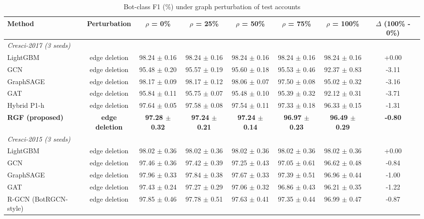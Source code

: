 \begin{table}[!t]
\centering
\caption{Bot-class F1 (\%) under graph perturbation of test accounts}
\label{tab:graph_perturbation}
\scriptsize
\setlength{\tabcolsep}{3pt}
\begin{tabular}{lccccccc}
\hline
\textbf{Method} & \textbf{Perturbation} & \textbf{$\rho$ = 0\%} & \textbf{$\rho$ = 25\%} & \textbf{$\rho$ = 50\%} & \textbf{$\rho$ = 75\%} & \textbf{$\rho$ = 100\%} & \textbf{$\Delta$ (100\% - 0\%)} \\
\hline
\multicolumn{8}{l}{\textit{Cresci-2017 (3 seeds)}} \\
LightGBM & edge deletion & 98.24 $\pm$ 0.16 & 98.24 $\pm$ 0.16 & 98.24 $\pm$ 0.16 & 98.24 $\pm$ 0.16 & 98.24 $\pm$ 0.16 & +0.00 \\
GCN & edge deletion & 95.48 $\pm$ 0.20 & 95.57 $\pm$ 0.19 & 95.60 $\pm$ 0.18 & 95.53 $\pm$ 0.46 & 92.37 $\pm$ 0.83 & -3.11 \\
GraphSAGE & edge deletion & 98.17 $\pm$ 0.09 & 98.17 $\pm$ 0.12 & 98.06 $\pm$ 0.07 & 97.50 $\pm$ 0.08 & 95.02 $\pm$ 0.32 & -3.16 \\
GAT & edge deletion & 95.84 $\pm$ 0.11 & 95.75 $\pm$ 0.07 & 95.48 $\pm$ 0.10 & 95.39 $\pm$ 0.32 & 92.12 $\pm$ 0.31 & -3.71 \\
Hybrid P1-h & edge deletion & 97.64 $\pm$ 0.05 & 97.58 $\pm$ 0.08 & 97.54 $\pm$ 0.11 & 97.33 $\pm$ 0.18 & 96.33 $\pm$ 0.15 & -1.31 \\
\textbf{RGF (proposed)} & \textbf{edge deletion} & \textbf{97.28 $\pm$ 0.32} & \textbf{97.24 $\pm$ 0.21} & \textbf{97.24 $\pm$ 0.14} & \textbf{96.97 $\pm$ 0.23} & \textbf{96.49 $\pm$ 0.29} & \textbf{-0.80} \\
\multicolumn{8}{l}{\textit{Cresci-2015 (3 seeds)}} \\
LightGBM & edge deletion & 98.02 $\pm$ 0.36 & 98.02 $\pm$ 0.36 & 98.02 $\pm$ 0.36 & 98.02 $\pm$ 0.36 & 98.02 $\pm$ 0.36 & +0.00 \\
GCN & edge deletion & 97.46 $\pm$ 0.36 & 97.42 $\pm$ 0.39 & 97.25 $\pm$ 0.43 & 97.05 $\pm$ 0.61 & 96.62 $\pm$ 0.48 & -0.84 \\
GraphSAGE & edge deletion & 97.96 $\pm$ 0.33 & 97.84 $\pm$ 0.38 & 97.67 $\pm$ 0.33 & 97.39 $\pm$ 0.51 & 96.96 $\pm$ 0.44 & -1.00 \\
GAT & edge deletion & 97.43 $\pm$ 0.24 & 97.27 $\pm$ 0.29 & 97.06 $\pm$ 0.32 & 96.86 $\pm$ 0.43 & 96.21 $\pm$ 0.35 & -1.22 \\
R-GCN (BotRGCN-style) & edge deletion & 97.85 $\pm$ 0.46 & 97.78 $\pm$ 0.51 & 97.63 $\pm$ 0.41 & 97.35 $\pm$ 0.44 & 96.99 $\pm$ 0.47 & -0.87 \\

\end{tabular}
\end{table}
